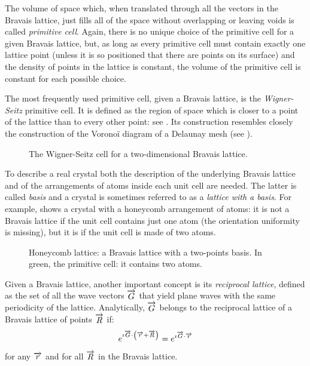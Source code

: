 The volume of space which, when translated through all the vectors in
the Bravais lattice, just fills all of the space without overlapping
or leaving voids is called \emph{primitive cell}. Again, there is no
unique choice of the primitive cell for a given Bravais lattice, but,
as long as every primitive cell must contain exactly one lattice point
(unless it is so positioned that there are points on its surface) and
the density of points in the lattice is constant, the volume of the
primitive cell is constant for each possible choice.

The most frequently used primitive cell, given a Bravais lattice, is
the \emph{Wigner-Seitz} primitive cell. It is defined as the region of
space which is closer to a point of the lattice than to every other
point: see . Its construction resembles closely the
construction of the
Vorono\"i diagram of a Delaunay mesh (see
).

\begin{figure}[htbp]
  \begin{center}
    \resizebox{6cm}{!}{}
  \end{center}
  \caption{The Wigner-Seitz cell for a two-dimensional Bravais
    lattice.}
  \label{fig:wigner}
\end{figure}

To describe a real crystal both the description of the underlying
Bravais lattice and of the arrangements of atoms inside each unit cell
are needed. The latter is called \emph{basis} and a crystal is
sometimes referred to as a \emph{lattice with a basis}. For example,
 shows a crystal with a honeycomb arrangement of
atoms: it is not a Bravais lattice if the unit cell contains just one
atom (the orientation uniformity is missing), but it is if the unit
cell is made of two atoms.

\begin{figure}[htbp]
  \begin{center}
    \resizebox{6cm}{!}{}
  \end{center}
  \caption{Honeycomb lattice: a Bravais lattice with a two-points
    basis. In green, the primitive cell: it contains two atoms.}
  \label{fig:honeycomb}
\end{figure}

Given a Bravais lattice, another important concept is its
\emph{reciprocal lattice}, defined as the set of all the wave vectors
$\overrightarrow{G}$ that yield plane waves with the same periodicity of the
lattice. Analytically, $\overrightarrow{G}$ belongs to the reciprocal lattice
of a Bravais lattice of points $\overrightarrow{R}$ if:
\begin{equation} \label{eqn:pwe_reciprocal_long}
  e^{\imath {\overrightarrow{G} \cdot \left(\overrightarrow{r}+\overrightarrow{R}\right)}} = e^{\imath {\overrightarrow{G} \cdot \overrightarrow{r}}}
\end{equation}
for any $\overrightarrow{r}$ and for all $\overrightarrow{R}$ in the Bravais
lattice.

